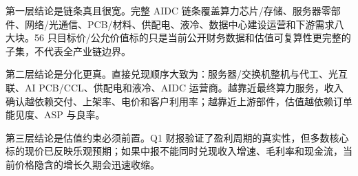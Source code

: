 第一层结论是链条真且很宽。完整 AIDC 链条覆盖算力芯片/存储、服务器零部件、网络/光通信、PCB/材料、供配电、液冷、数据中心建设运营和下游需求八大块。56 只目标价/公允价值标的只是当前公开财务数据和估值可复算性更完整的子集，不代表全产业链边界。

第二层结论是分化更真。直接兑现顺序大致为：服务器/交换机整机与代工、光互联、AI PCB/CCL、供配电和液冷、AIDC 运营商。越靠近最终算力服务，收入确认越依赖交付、上架率、电价和客户利用率；越靠近上游部件，估值越依赖订单能见度、ASP 与良率。

第三层结论是估值约束必须前置。Q1 财报验证了盈利周期的真实性，但多数核心标的现价已反映乐观预期；如果中报不能同时兑现收入增速、毛利率和现金流，当前价格隐含的增长久期会迅速收缩。
